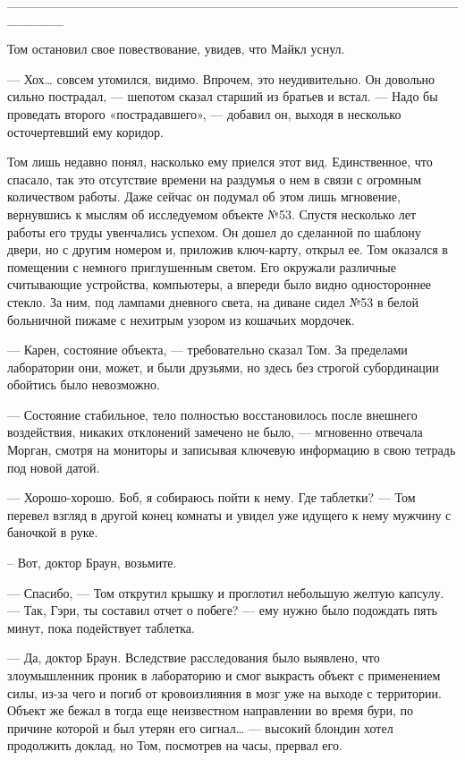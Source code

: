 ______________________________________________________

Том остановил свое повествование, увидев, что Майкл уснул.

— Хох… совсем утомился, видимо. Впрочем, это неудивительно. Он довольно сильно пострадал, — шепотом сказал старший из братьев и встал. — Надо бы проведать второго «пострадавшего», — добавил он, выходя в несколько осточертевший ему коридор.

Том лишь недавно понял, насколько ему приелся этот вид. Единственное, что спасало, так это отсутствие времени на раздумья о нем в связи с огромным количеством работы. Даже сейчас он подумал об этом лишь мгновение, вернувшись к мыслям об исследуемом объекте №53. Спустя несколько лет работы его труды увенчались успехом. Он дошел до сделанной по шаблону двери, но с другим номером и, приложив ключ-карту, открыл ее. Том оказался в помещении с немного приглушенным светом. Его окружали различные считывающие устройства, компьютеры, а впереди было видно одностороннее стекло. За ним, под лампами дневного света, на диване сидел №53 в белой больничной пижаме с нехитрым узором из кошачьих мордочек.

— Карен, состояние объекта, — требовательно сказал Том. За пределами лаборатории они, может, и были друзьями, но здесь без строгой субординации обойтись было невозможно.

— Состояние стабильное, тело полностью восстановилось после внешнего воздействия, никаких отклонений замечено не было, — мгновенно отвечала Морган, смотря на мониторы и записывая ключевую информацию в свою тетрадь под новой датой.

— Хорошо-хорошо. Боб, я собираюсь пойти к нему. Где таблетки? — Том перевел взгляд в другой конец комнаты и увидел уже идущего к нему мужчину с баночкой в руке.

– Вот, доктор Браун, возьмите.

— Спасибо, — Том открутил крышку и проглотил небольшую желтую капсулу. — Так, Гэри, ты составил отчет о побеге? — ему нужно было подождать пять минут, пока подействует таблетка.

— Да, доктор Браун. Вследствие расследования было выявлено, что злоумышленник проник в лабораторию и смог выкрасть объект с применением силы, из-за чего и погиб от кровоизлияния в мозг уже на выходе с территории. Объект же бежал в тогда еще неизвестном направлении во время бури, по причине которой и был утерян его сигнал… — высокий блондин хотел продолжить доклад, но Том, посмотрев на часы, прервал его.


